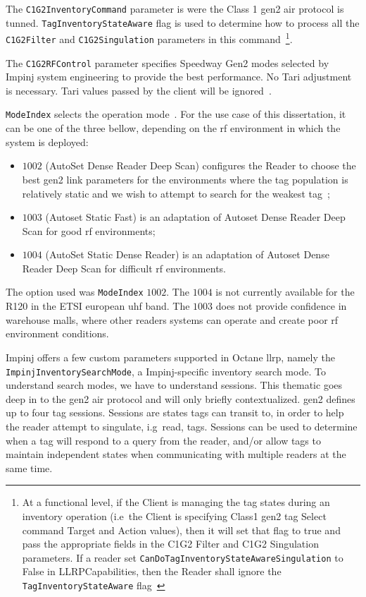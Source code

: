 The \texttt{C1G2InventoryCommand} parameter is were the Class 1 \ac{gen2} air protocol is tunned.
\texttt{TagInventoryStateAware} flag is used to determine how to process all the \texttt{C1G2Filter} and \texttt{C1G2Singulation} parameters in this command~\footnote{At a functional level, if the Client is managing the tag states during an inventory operation (i.e\ the Client is specifying Class1 \ac{gen2} tag Select command Target and Action values), then it will set that flag to true and pass the appropriate fields in the C1G2 Filter and C1G2 Singulation parameters. If a reader set \texttt{CanDoTagInventoryStateAwareSingulation} to False in LLRPCapabilities, then the Reader shall ignore the \texttt{TagInventoryStateAware} flag~\cite{LowLevelReader}}.

The \texttt{C1G2RFControl} parameter specifies Speedway Gen2 modes selected by Impinj system engineering to provide the best performance. No Tari adjustment is necessary. Tari values passed by the client will be ignored~\cite{ImpinjOctaneLLRP}.

\texttt{ModeIndex} selects the operation mode~\cite{ReaderModesMade, ImpinjOctaneLLRP}. For the use case of this dissertation, it can be one of the three bellow, depending on the \ac{rf} environment in which the system is deployed: 

\begin{itemize}
    \item $1002$ (AutoSet Dense Reader Deep Scan) configures the Reader to choose the best \ac{gen2} link parameters for the environments where the tag population is relatively static and we wish to attempt to search for the weakest tag~\cite{ReaderMode1002};
    \item $1003$ (Autoset Static Fast) is an adaptation of Autoset Dense Reader Deep Scan for good \ac{rf} environments;
    \item $1004$ (AutoSet Static Dense Reader) is an adaptation of Autoset Dense Reader Deep Scan for difficult \ac{rf} environments.
\end{itemize}

The option used was \texttt{ModeIndex} $1002$. The $1004$ is not currently available for the R120 in the ETSI european \ac{uhf} band. The $1003$ does not provide confidence in warehouse malls, where other readers systems can operate and create poor \ac{rf} environment conditions.

Impinj offers a few custom parameters supported in Octane \ac{llrp}, namely the \texttt{ImpinjInventorySearchMode}, a Impinj-specific inventory search mode. 
To understand search modes, we have to understand sessions. This thematic goes deep in to the \ac{gen2} air protocol and will only briefly contextualized. \ac{gen2} defines up to four tag sessions. Sessions are states tags can transit to, in order to help the reader attempt to singulate, i.g\ read, tags.
Sessions can be used to determine when a tag will respond to a query from the reader, and/or allow tags to maintain independent states when communicating with multiple readers at the same time. 

